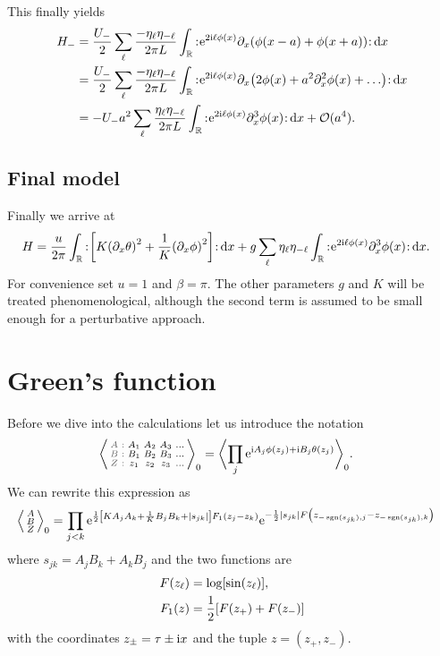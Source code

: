 \documentclass[english, parskip=full]{scrartcl}
\begin{document}
This finally yields
\begin{align}
H_- &= \frac{U_-}{2} \sum_\ell \frac{-\eta_\ell \eta_{-\ell}}{2\pi L} \intr{\normord{ \powe{2\i\ell\phi(x)} \partial_x\kla*{\phi(x-a) + \phi(x+a)} }}{x} \\
&=  \frac{U_-}{2} \sum_\ell \frac{-\eta_\ell \eta_{-\ell}}{2\pi L} \intr{\normord{ \powe{2\i\ell\phi(x)} \partial_x\kla*{2\phi(x) + a^2\partial_x^2\phi(x) + \dots} }}{x}\\
&= -U_- a^2 \sum_{\ell} \frac{\eta_\ell \eta_{-\ell}}{2\pi L} \intr{\normord{ \powe{2\i\ell\phi(x)} \partial_x^3\phi(x)}}{x} + \mathcal{O}(a^4).
\end{align}
\subsection{Final model}
Finally we arrive at 
\begin{align}
H &= \frac{u}{2\pi} \intr{\normord{\klb*{K \kla*{\partial_x\theta}^2 + \frac{1}{K} \kla*{\partial_x\phi}^2}}}{x} + g \sum_\ell \eta_\ell \eta_{-\ell} \intr{\normord{\powe{2\i\ell\phi(x)} \partial_x^3\phi(x)}}{x}.
\end{align}
For convenience set $u=1$ and $\beta=\pi$.
The other parameters $g$ and $K$ will be treated phenomenological, although the second term is assumed to be small enough for a perturbative approach.
\section{Green's function}
Before we dive into the calculations let us introduce the notation
\begin{align}
\bra*{\zabx{A_1&A_2&A_3&\dots}{B_1&B_2&B_3&\dots}{z_1&z_2&z_3&\dots}}_0 &= \bra[\bigg]{\prod_j \powe{\i A_j\phi(z_j) + \i B_j\theta(z_j)}}_0.
\end{align}
We can rewrite this expression as
\begin{align}
\bra*{\abx{A}{B}{Z}}_0 &= \prod_{j<k} \powe{\frac{1}{2}\klb*{KA_jA_k + \frac{1}{K}B_jB_k + \abs*{s_{jk}}}F_1(z_j-z_k)} \powe{-\frac{1}{2}|s_{jk}| F\kla*{z_{-\sgn(s_{jk}),j} - z_{-\sgn(s_{jk}), k}}}
\end{align}
where $s_{jk} = A_jB_k+A_kB_j$ and the two functions are
\begin{align}
F(z_\ell) &= \log\klb*{\sin(z_\ell)},\\
F_1(z) &= \frac{1}{2} \klb*{F(z_+) + F(z_-)}
\end{align}
with the coordinates $z_\pm = \tau \pm \i x$ and the tuple $z=(z_+,z_-)$.
\end{document}
